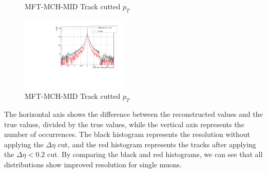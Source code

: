\begin{figure}[htbp]
\begin{minipage}{0.45\textwidth}
                        \caption{MFT-MCH-MID Track cutted $p_T$}
                        \label{Analysis:Matching:eta resolution}
                    \end{minipage}
                \end{figure}

                \begin{figure}[htbp]
                    \centering
                    \includegraphics[width=0.45\textwidth]{fig/3_3_phi_resolution.pdf} %
                    \caption{MFT-MCH-MID Track cutted $p_T$}
                    \label{Analysis:Matching:phi resolution}
                \end{figure}
                The horizontal axis shows the difference between the reconstructed values and the true values, divided by the true values, while the vertical axis represents the number of occurrences. The black histogram represents the resolution without applying the $\Delta \eta$ cut, and the red histogram represents the tracks after applying the $\Delta \eta < 0.2$ cut. By comparing the black and red histograms, we can see that all distributions show improved resolution for single muons.%
